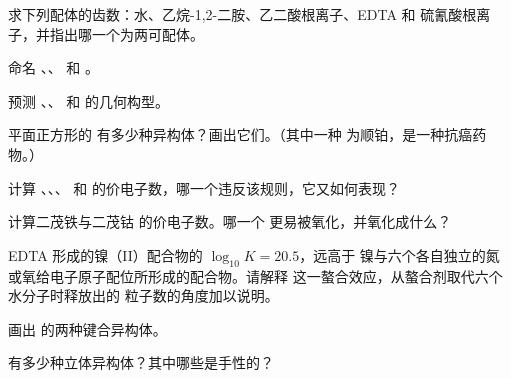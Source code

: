 \begin{exercise}[$\star$]\label{exo:b2:coordination-complexes:2}
求下列配体的齿数：水、乙烷-1,2-二胺、乙二酸根离子、EDTA 和
硫氰酸根离子，并指出哪一个为两可配体。
\end{exercise}

\begin{exercise}[$\star$]\label{exo:b2:coordination-complexes:3}
命名 、、 和
\ce{[Ni(CO)4]}。
\end{exercise}

\begin{exercise}[$\star$]\label{exo:b2:coordination-complexes:4}
预测 \ce{[Ag(NH3)2]+}、、 和
 的几何构型。
\end{exercise}

\begin{exercise}[$\star\star$]\label{exo:b2:coordination-complexes:5}
平面正方形的 \ce{[PtCl2(NH3)2]} 有多少种异构体？画出它们。（其中一种
为顺铂，是一种抗癌药物。）
\end{exercise}

\begin{exercise}[$\star\star$]\label{exo:b2:coordination-complexes:6}
计算 、、、
 和  的价电子数，哪一个违反该规则，它又如何表现？
\end{exercise}

\begin{exercise}[$\star\star$]\label{exo:b2:coordination-complexes:7}
计算二茂铁与二茂钴  的价电子数。哪一个
更易被氧化，并氧化成什么？
\end{exercise}

\begin{exercise}[$\star\star$]\label{exo:b2:coordination-complexes:8}
EDTA 形成的镍（II）配合物的 $\log_{10}K = 20.5$，远高于
镍与六个各自独立的氮或氧给电子原子配位所形成的配合物。请解释
这一螯合效应，从螯合剂取代六个水分子时释放出的
粒子数的角度加以说明。
\end{exercise}

\begin{exercise}[$\star\star$]\label{exo:b2:coordination-complexes:9}
画出  的两种键合异构体。
\end{exercise}

\begin{exercise}[$\star\star\star$]\label{exo:b2:coordination-complexes:10}
\ce{[CoCl2(en)2]+} 有多少种立体异构体？其中哪些是手性的？
\end{exercise}

